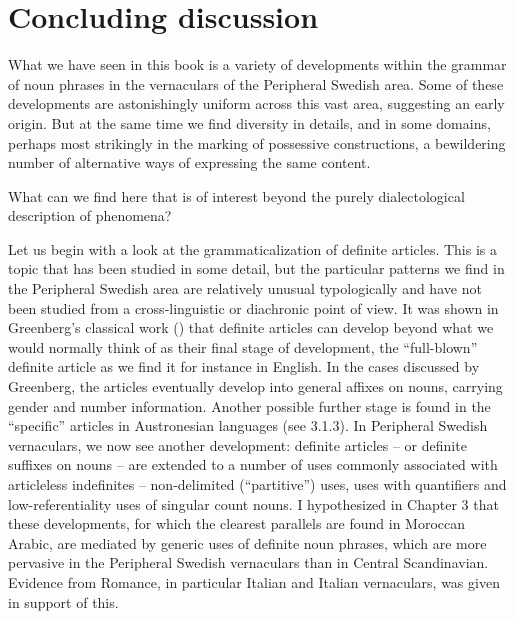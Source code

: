 
\chapter[Concluding discussion]{\rmfamily Concluding discussion}

What we have seen in this book is a variety of developments within the grammar of noun phrases in the vernaculars of the Peripheral Swedish area. Some of these developments are astonishingly uniform across this vast area, suggesting an early origin. But at the same time we find diversity in details, and in some domains, perhaps most strikingly in the marking of possessive constructions, a bewildering number of alternative ways of expressing the same content. 


What can we find here that is of interest beyond the purely dialectological description of phenomena? 


Let us begin with a look at the grammaticalization of definite articles. This is a topic that has been studied in some detail, but the particular patterns we find in the Peripheral Swedish area are relatively unusual typologically and have not been studied from a cross-linguistic or diachronic point of view. It was shown in Greenberg’s classical work (\citet{Greenberg1978}) that definite articles can develop beyond what we would normally think of as their final stage of development, the “full-blown” definite article as we find it for instance in English. In the cases discussed by Greenberg, the articles eventually develop into general affixes on nouns, carrying gender and number information. Another possible further stage is found in the “specific” articles in Austronesian languages (see 3.1.3). In Peripheral Swedish vernaculars, we now see another development: definite articles – or definite suffixes on nouns – are extended to a number of uses commonly associated with articleless indefinites – non-delimited (“partitive”) uses, uses with quantifiers and low-referentiality uses of singular count nouns. I hypothesized in Chapter 3 that these developments, for which the clearest parallels are found in Moroccan Arabic, are mediated by generic uses of definite noun phrases, which are more pervasive in the Peripheral Swedish vernaculars than in Central Scandinavian. Evidence from Romance, in particular Italian and Italian vernaculars, was given in support of this. 

